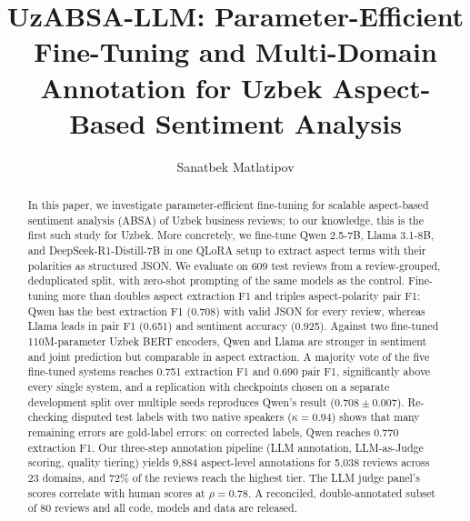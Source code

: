 \documentclass[runningheads]{llncs}
\begin{document}
%
\title{UzABSA-LLM: Parameter-Efficient Fine-Tuning and Multi-Domain Annotation for Uzbek Aspect-Based Sentiment Analysis}
%
%
\author{Sanatbek Matlatipov}
%
%
%
\maketitle              %
%
\begin{abstract}
In this paper, we investigate parameter-efficient fine-tuning for scalable aspect-based sentiment analysis (ABSA) of Uzbek business reviews; to our knowledge, this is the first such study for Uzbek. More concretely, we fine-tune Qwen 2.5-7B, Llama 3.1-8B, and DeepSeek-R1-Distill-7B in one QLoRA setup to extract aspect terms with their polarities as structured JSON. We evaluate on 609 test reviews from a review-grouped, deduplicated split, with zero-shot prompting of the same models as the control. Fine-tuning more than doubles aspect extraction F1 and triples aspect-polarity pair F1: Qwen has the best extraction F1 (0.708) with valid JSON for every review, whereas Llama leads in pair F1 (0.651) and sentiment accuracy (0.925). Against two fine-tuned 110M-parameter Uzbek BERT encoders, Qwen and Llama are stronger in sentiment and joint prediction but comparable in aspect extraction. A majority vote of the five fine-tuned systems reaches 0.751 extraction F1 and 0.690 pair F1, significantly above every single system, and a replication with checkpoints chosen on a separate development split over multiple seeds reproduces Qwen's result ($0.708\pm0.007$). Re-checking disputed test labels with two native speakers ($\kappa=0.94$) shows that many remaining errors are gold-label errors: on corrected labels, Qwen reaches 0.770 extraction F1. Our three-step annotation pipeline (LLM annotation, LLM-as-Judge scoring, quality tiering) yields 9,884 aspect-level annotations for 5,038 reviews across 23 domains, and 72\% of the reviews reach the highest tier. The LLM judge panel's scores correlate with human scores at $\rho=0.78$. A reconciled, double-annotated subset of 80 reviews and all code, models and data are released.

\end{abstract}
%
%
%
\end{document}
